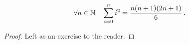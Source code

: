 \guard



\begin{prop}
\label{prop:sumOfSquares}
  \[\forall n\in\mathbb{N}\quad\sum_{i=0}^n i^2 = \frac{n(n+1)(2n+1)}{6}\,.\]
\end{prop}
\begin{proof}
  Left as an exercise to the reader.
\end{proof}
